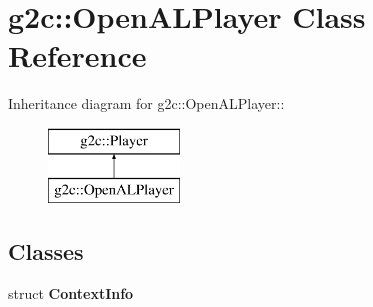 \hypertarget{classg2c_1_1_open_a_l_player}{
\section{g2c::OpenALPlayer Class Reference}
\label{classg2c_1_1_open_a_l_player}
}
Inheritance diagram for g2c::OpenALPlayer::\begin{figure}[H]
\begin{center}
\leavevmode
\includegraphics[height=2cm]{classg2c_1_1_open_a_l_player}
\end{center}
\end{figure}
\subsection*{Classes}
\begin{DoxyCompactItemize}
\item 
struct {\bfseries ContextInfo}
\end{DoxyCompactItemize}
